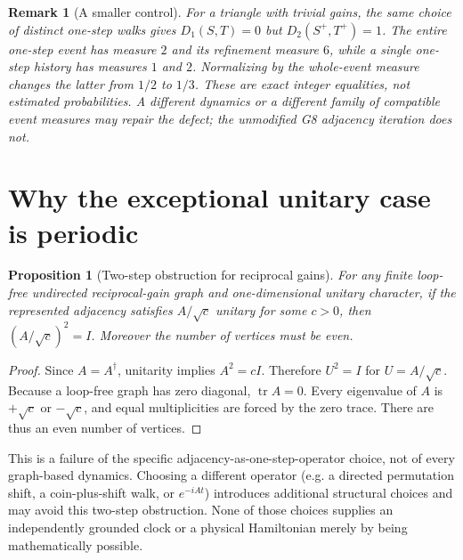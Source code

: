 \documentclass[11pt]{article}
\newtheorem{proposition}[theorem]{Proposition}
\newtheorem{remark}[theorem]{Remark}
\begin{document}
\begin{remark}[A smaller control]
For a triangle with trivial gains, the same choice of distinct one-step walks gives $D_1(S,T)=0$ but $D_2(S^+,T^+)=1$. The entire one-step event has measure $2$ and its refinement measure $6$, while a single one-step history has measures $1$ and $2$. Normalizing by the whole-event measure changes the latter from $1/2$ to $1/3$. These are exact integer equalities, not estimated probabilities. A different dynamics or a different family of compatible event measures may repair the defect; the unmodified G8 adjacency iteration does not.
\end{remark}

\section{Why the exceptional unitary case is periodic}
\begin{proposition}[Two-step obstruction for reciprocal gains]\label{prop:two}
For any finite loop-free undirected reciprocal-gain graph and one-dimensional unitary character, if the represented adjacency satisfies $A/\sqrt c$ unitary for some $c>0$, then $(A/\sqrt c)^2=I$. Moreover the number of vertices must be even.
\end{proposition}
\begin{proof}
Since $A=A^\dagger$, unitarity implies $A^2=cI$. Therefore $U^2=I$ for $U=A/\sqrt c$. Because a loop-free graph has zero diagonal, $\operatorname{tr}A=0$. Every eigenvalue of $A$ is $+\sqrt c$ or $-\sqrt c$, and equal multiplicities are forced by the zero trace. There are thus an even number of vertices.
\end{proof}
This is a failure of the specific adjacency-as-one-step-operator choice, not of every graph-based dynamics. Choosing a different operator (e.g. a directed permutation shift, a coin-plus-shift walk, or $e^{-iAt}$) introduces additional structural choices and may avoid this two-step obstruction. None of those choices supplies an independently grounded clock or a physical Hamiltonian merely by being mathematically possible.
\end{document}
